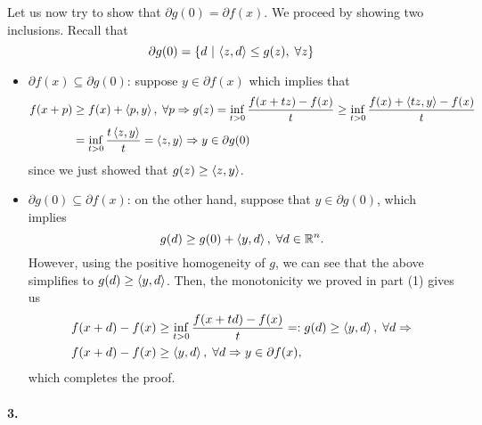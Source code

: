 \documentclass[10pt]{article}
\begin{document}
\begin{Exercise}
    Let us now try to show that $\partial g(0) = \partial f(x)$. We proceed by
    showing two inclusions. Recall that
    \[
        \partial g(0) = \left\{ d \ \middle| \  \left\langle z, d \right\rangle \leq g(z), \; \forall z \right\}
    \]
    \begin{itemize}
    \item $\partial f(x) \subseteq \partial g(0)$: suppose $y \in \partial f(x)$
        which implies that
        \begin{align*}
            f(x + p) &\geq f(x) + \left\langle p, y \right\rangle, \; \forall p \Rightarrow
            g(z) = \inf_{t > 0} \frac{f(x + tz) - f(x)}{t} \geq
                \inf_{t > 0} \frac{f(x) + \left\langle tz, y \right\rangle - f(x)}{t} \\
                &= \inf_{t > 0} \frac{t \left\langle z, y \right\rangle}{t} = \left\langle z, y \right\rangle
                \Rightarrow y \in \partial g(0)
        \end{align*}
        since we just showed that $g(z) \geq \left\langle z, y \right\rangle$.
    \item $\partial g(0) \subseteq \partial f(x)$: on the other hand, suppose
    that $y \in \partial g(0)$, which implies
    \[
        g(d) \geq g(0) + \left\langle y, d \right\rangle, \; \forall d \in \mathbb{R}^n.
    \]
    However, using the positive homogeneity of $g$, we can see that the above
    simplifies to $g(d) \geq \left\langle y, d \right\rangle$. Then, the monotonicity we proved in
    part (1) gives us
    \begin{align*}
        f(x + d) - f(x) &\geq \inf_{t > 0} \frac{f(x + td) - f(x)}{t}
            =: g(d) \geq \left\langle y, d \right\rangle, \; \forall d \Rightarrow \\
        f(x + d) - f(x) &\geq \left\langle y, d \right\rangle, \; \forall d \Rightarrow
            y \in \partial f(x),
    \end{align*}
    which completes the proof.
    \end{itemize}

    \paragraph{3.}


\end{Exercise}
\end{document}
